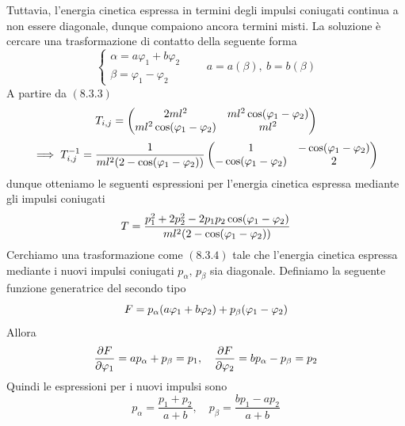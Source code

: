 \documentclass{article}
\begin{document}
Tuttavia, l'energia cinetica espressa in termini degli impulsi coniugati continua a non essere diagonale, dunque compaiono ancora termini misti. La soluzione è cercare una trasformazione di contatto della seguente forma
\begin{equation}
    \begin{cases}
        \alpha = a\varphi_1 + b\varphi_2 \\
        \beta = \varphi_1 - \varphi_2
    \end{cases} \qquad a = a(\beta), \ b = b(\beta) \tag{8.3.4}
\end{equation}
A partire da $(8.3.3)$
\begin{equation} T_{i,j} = 
    \begin{pmatrix}
        2ml^2 & ml^2\cos (\varphi_1 - \varphi_2) \\
        ml^2\cos (\varphi_1 - \varphi_2) & ml^2
    \end{pmatrix} \notag
\end{equation}
\begin{equation}
    \implies T^{-1}_{i,j} = \frac{1}{ml^2(2 - \cos (\varphi_1 - \varphi_2))}
    \begin{pmatrix}
        1 & -\cos (\varphi_1 - \varphi_2) \\
        -\cos (\varphi_1 - \varphi_2) & 2
    \end{pmatrix} \notag
\end{equation}
dunque otteniamo le seguenti espressioni per l'energia cinetica espressa mediante gli impulsi coniugati
\begin{equation}
    T = \frac{p_1^2 + 2p_2^2 - 2p_1p_2\cos (\varphi_1 - \varphi_2)}{ml^2(2 - \cos (\varphi_1 - \varphi_2))} \notag
\end{equation}
Cerchiamo una trasformazione come $(8.3.4)$ tale che l'energia cinetica espressa mediante i nuovi impulsi coniugati $p_\alpha, \, p_\beta$ sia diagonale. Definiamo la seguente funzione generatrice del secondo tipo
\begin{equation}
    F = p_\alpha(a\varphi_1 + b\varphi_2) + p_\beta(\varphi_1 - \varphi_2) \notag
\end{equation}
Allora
\begin{equation}
    \frac{\partial F}{\partial \varphi_1} = ap_\alpha + p_\beta = p_1, \quad \frac{\partial F}{\partial \varphi_2} = bp_\alpha - p_\beta = p_2 \notag
\end{equation}
Quindi le espressioni per i nuovi impulsi sono
\begin{equation}
    p_\alpha = \frac{p_1 + p_2}{a+b}, \quad p_\beta = \frac{bp_1 - ap_2}{a+b} \tag{8.3.5}
\end{equation}
\end{document}
